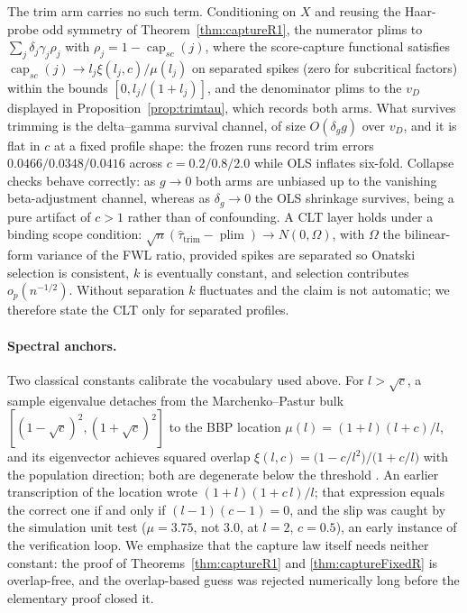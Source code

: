 The trim arm carries no such term. Conditioning on $X$ and reusing the Haar-probe odd symmetry of Theorem~\ref{thm:captureR1}, the numerator plims to $\sum_j\delta_j\gamma_j\rho_j$ with $\rho_j=1-\operatorname{cap}_{sc}(j)$, where the score-capture functional satisfies $\operatorname{cap}_{sc}(j)\to l_j\xi(l_j,c)/\mu(l_j)$ on separated spikes (zero for subcritical factors) within the bounds $[0,l_j/(1+l_j)]$, and the denominator plims to the $v_D$ displayed in Proposition~\ref{prop:trimtau}, which records both arms. What survives trimming is the delta--gamma survival channel, of size $O(\delta_g g)$ over $v_D$, and it is flat in $c$ at a fixed profile shape: the frozen runs record trim errors $0.0466/0.0348/0.0416$ across $c=0.2/0.8/2.0$ while OLS inflates six-fold. Collapse checks behave correctly: as $g\to 0$ both arms are unbiased up to the vanishing beta-adjustment channel, whereas as $\delta_g\to 0$ the OLS shrinkage survives, being a pure artifact of $c>1$ rather than of confounding. A CLT layer holds under a binding scope condition: $\sqrt n(\hat\tau_{\mathrm{trim}}-\operatorname{plim})\to N(0,\Omega)$, with $\Omega$ the bilinear-form variance of the FWL ratio, provided spikes are separated so Onatski selection is consistent, $k$ is eventually constant, and selection contributes $o_p(n^{-1/2})$. Without separation $k$ fluctuates and the claim is not automatic; we therefore state the CLT only for separated profiles.

\paragraph{Spectral anchors.}
Two classical constants calibrate the vocabulary used above. For $l>\sqrt c$, a sample eigenvalue detaches from the Marchenko--Pastur bulk $[(1-\sqrt c)^2,(1+\sqrt c)^2]$ to the BBP location
$\mu(l)=(1+l)(l+c)/l$,
and its eigenvector achieves squared overlap
$\xi(l,c)=\bigl(1-c/l^2\bigr)/\bigl(1+c/l\bigr)$
with the population direction; both are degenerate below the threshold \citep{bbp2005phase,benaychgeorges2011eigenvalues}. An earlier transcription of the location wrote $(1+l)(1+c\,l)/l$; that expression equals the correct one if and only if $(l-1)(c-1)=0$, and the slip was caught by the simulation unit test ($\mu=3.75$, not $3.0$, at $l=2$, $c=0.5$), an early instance of the verification loop. We emphasize that the capture law itself needs neither constant: the proof of Theorems~\ref{thm:captureR1} and \ref{thm:captureFixedR} is overlap-free, and the overlap-based guess was rejected numerically long before the elementary proof closed it.

